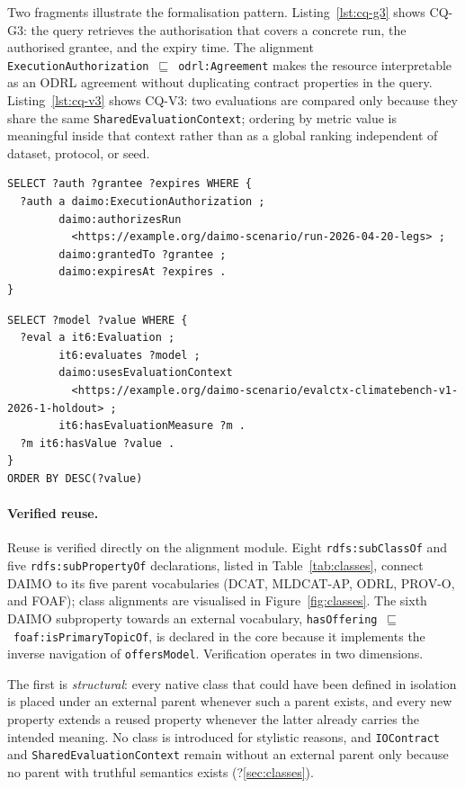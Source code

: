 \documentclass[Afour,sagev,times]{sagej}
\newcommand{\code}[1]{\texttt{#1}}
\begin{document}
Two fragments illustrate the formalisation pattern. Listing~\ref{lst:cq-g3} shows CQ-G3: the query retrieves the authorisation that covers a concrete run, the authorised grantee, and the expiry time. The alignment \code{ExecutionAuthorization}~$\sqsubseteq$~\code{odrl:Agreement} makes the resource interpretable as an ODRL agreement without duplicating contract properties in the query. Listing~\ref{lst:cq-v3} shows CQ-V3: two evaluations are compared only because they share the same \code{SharedEvaluationContext}; ordering by metric value is meaningful inside that context rather than as a global ranking independent of dataset, protocol, or seed.

\begin{lstlisting}[label=lst:cq-g3,caption={CQ-G3: authorisation and agreement for a specific run.}]
SELECT ?auth ?grantee ?expires WHERE {
  ?auth a daimo:ExecutionAuthorization ;
        daimo:authorizesRun
          <https://example.org/daimo-scenario/run-2026-04-20-legs> ;
        daimo:grantedTo ?grantee ;
        daimo:expiresAt ?expires .
}
\end{lstlisting}

\begin{lstlisting}[label=lst:cq-v3,caption={CQ-V3: ranking of models under a shared evaluation context.}]
SELECT ?model ?value WHERE {
  ?eval a it6:Evaluation ;
        it6:evaluates ?model ;
        daimo:usesEvaluationContext
          <https://example.org/daimo-scenario/evalctx-climatebench-v1-2026-1-holdout> ;
        it6:hasEvaluationMeasure ?m .
  ?m it6:hasValue ?value .
}
ORDER BY DESC(?value)
\end{lstlisting}

\paragraph{Verified reuse.}\label{sec:eval-reuse}

Reuse is verified directly on the alignment module. Eight \code{rdfs:subClassOf} and five \code{rdfs:subPropertyOf} declarations, listed in Table~\ref{tab:classes}, connect DAIMO to its five parent vocabularies (DCAT, MLDCAT-AP, ODRL, PROV-O, and FOAF); class alignments are visualised in Figure~\ref{fig:classes}. The sixth DAIMO subproperty towards an external vocabulary, \code{hasOffering}~$\sqsubseteq$~\code{foaf:isPrimaryTopicOf}, is declared in the core because it implements the inverse navigation of \code{offersModel}. Verification operates in two dimensions.

The first is \emph{structural}: every native class that could have been defined in isolation is placed under an external parent whenever such a parent exists, and every new property extends a reused property whenever the latter already carries the intended meaning. No class is introduced for stylistic reasons, and \code{IOContract} and \code{SharedEvaluationContext} remain without an external parent only because no parent with truthful semantics exists (?\ref{sec:classes}).
\end{document}
